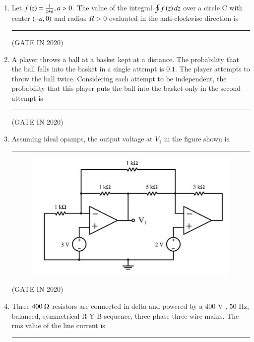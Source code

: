\documentclass[journal,12pt,onecolumn]{IEEEtran}
\theoremstyle{remark}
\begin{document}
\begin{enumerate}
\item Let $f\left(z\right) = \frac{1}{z+a}, a > 0$. The value of the integral $\oint f\left(z\right)dz$ over a circle C with center $\left(-a, 0\right)$ and radius $R > 0$ evaluated in the anti-clockwise direction is \rule{2cm}{0.4pt}

\hfill{(GATE IN 2020)}
\begin{enumerate}
\end{enumerate}

\item A player throws a ball at a basket kept at a distance. The probability that the ball falls into the basket in a single attempt is $0.1$. The player attempts to throw the ball twice. Considering each attempt to be independent, the probability that this player puts the ball into the basket only in the second attempt  is \rule{2cm}{0.4pt}

\hfill{(GATE IN 2020)}

\item Assuming ideal opamps, the output voltage at $V_1$ in the figure shown  is \rule{2cm}{0.4pt}
\begin{figure}[H]
\centering
\includegraphics[width=0.6\columnwidth]{figs/q10.jpg}
\caption*{}
\label{fig:q1}
\end{figure}

\hfill{(GATE IN 2020)}

\item Three $400~\ohm$ resistors are connected in delta and powered by a $400$ V , $50$ Hz, balanced, symmetrical R-Y-B sequence, three-phase three-wire mains. The rms value of the line current is \rule{2cm}{0.4pt} 


\end{enumerate}
\end{document}
